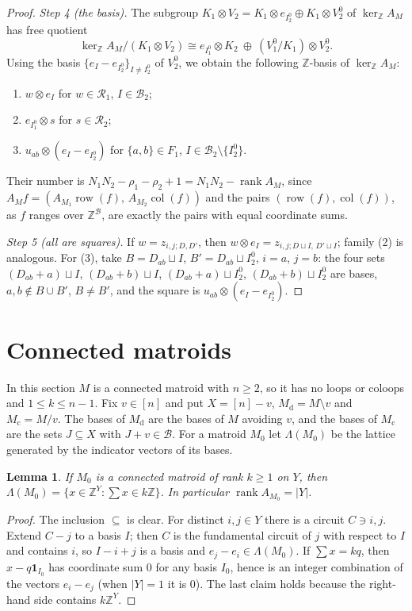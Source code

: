 \documentclass[11pt,a4paper]{article}
\theoremstyle{plain}
\newtheorem{lemma}[theorem]{Lemma}
\theoremstyle{definition}
\newcommand{\Z}{\mathbb Z}
\newcommand{\AM}{A_M}
\newcommand{\kerZ}{\ker_{\Z}\!A_M}
\newcommand{\bs}{\mathcal B}
\newcommand{\rank}{\operatorname{rank}}
\newcommand{\ind}{\mathbf 1}
\begin{document}
\begin{proof}
\emph{Step 4 (the basis).} The subgroup $K_1\otimes V_2=K_1\otimes e_{I_2^0}\oplus K_1\otimes V_2^0$ of $\kerZ$ has free quotient
\[
\kerZ/(K_1\otimes V_2)\cong e_{I_1^0}\otimes K_2\ \oplus\ (V_1^0/K_1)\otimes V_2^0 .
\]
Using the basis $\{e_I-e_{I_2^0}\}_{I\ne I_2^0}$ of $V_2^0$, we obtain the following $\Z$-basis of $\kerZ$:
\begin{enumerate}[label=(\arabic*),itemsep=1pt]
\item $w\otimes e_I$ for $w\in\mathcal R_1$, $I\in\bs_2$;
\item $e_{I_1^0}\otimes s$ for $s\in\mathcal R_2$;
\item $u_{ab}\otimes(e_I-e_{I_2^0})$ for $\{a,b\}\in F_1$, $I\in\bs_2\setminus\{I_2^0\}$.
\end{enumerate}
Their number is $N_1N_2-\rho_1-\rho_2+1=N_1N_2-\rank\AM$, since $\AM f=(A_{M_1}\operatorname{row}(f),\,A_{M_2}\operatorname{col}(f))$ and the pairs $(\operatorname{row}(f),\operatorname{col}(f))$, as $f$ ranges over $\Z^{\bs}$, are exactly the pairs with equal coordinate sums.

\emph{Step 5 (all are squares).} If $w=z_{i,j;D,D'}$, then $w\otimes e_I=z_{i,j;D\sqcup I,\,D'\sqcup I}$; family (2) is analogous. For (3), take $B=D_{ab}\sqcup I$, $B'=D_{ab}\sqcup I_2^0$, $i=a$, $j=b$: the four sets $(D_{ab}+a)\sqcup I$, $(D_{ab}+b)\sqcup I$, $(D_{ab}+a)\sqcup I_2^0$, $(D_{ab}+b)\sqcup I_2^0$ are bases, $a,b\notin B\cup B'$, $B\ne B'$, and the square is $u_{ab}\otimes(e_I-e_{I_2^0})$.
\end{proof}

\section{Connected matroids}\label{sec:conn}
In this section $M$ is a connected matroid with $n\ge2$, so it has no loops or coloops and $1\le k\le n-1$. Fix $v\in[n]$ and put $X=[n]-v$, $M_{\mathrm d}=M\setminus v$ and $M_{\mathrm c}=M/v$. The bases of $M_{\mathrm d}$ are the bases of $M$ avoiding $v$, and the bases of $M_{\mathrm c}$ are the sets $J\subseteq X$ with $J+v\in\bs$. For a matroid $M_0$ let $\Lambda(M_0)$ be the lattice generated by the indicator vectors of its bases.

\begin{lemma}\label{lem:lat}
If $M_0$ is a connected matroid of rank $k\ge1$ on $Y$, then $\Lambda(M_0)=\{x\in\Z^Y:\sum x\in k\Z\}$. In particular $\rank A_{M_0}=|Y|$.
\end{lemma}
\begin{proof}
The inclusion $\subseteq$ is clear. For distinct $i,j\in Y$ there is a circuit $C\ni i,j$. Extend $C-j$ to a basis $I$; then $C$ is the fundamental circuit of $j$ with respect to $I$ and contains $i$, so $I-i+j$ is a basis and $e_j-e_i\in\Lambda(M_0)$. If $\sum x=kq$, then $x-q\ind_{I_0}$ has coordinate sum $0$ for any basis $I_0$, hence is an integer combination of the vectors $e_i-e_j$ (when $|Y|=1$ it is $0$). The last claim holds because the right-hand side contains $k\Z^Y$.
\end{proof}
\end{document}
